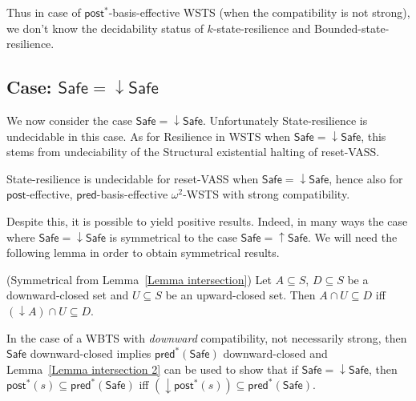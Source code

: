 \documentclass[runningheads]{llncs}
\newcommand{\mathieu}[1]{\todo[inline,color=blue!20]{{\bf MH:} #1}}
\newcommand{\pred}{\textsf{pred}}
\newcommand{\post}{\textsf{post}}
\newcommand{\Safe}{\textsf{Safe}}
\begin{document}
Thus in case of $\post^*$-basis-effective WSTS (when the compatibility is not strong), we don't know the decidability status of {\sc $k$-state-resilience} and 
{\sc Bounded-state-resilience}. 





\subsection{Case: $\Safe = \mathop{\downarrow} \Safe$}


We now consider the case $\Safe = \mathop{\downarrow} \Safe$.
%
Unfortunately {\sc State-resilience} is undecidable in this case. As for {\sc Resilience} in WSTS when $\Safe = \mathop{\downarrow} \Safe$, this stems from undeciability of the 
{\sc Structural existential halting} of reset-VASS.

\begin{proposition}\label{srp down up}
{\sc State-resilience} is undecidable for reset-VASS when
$\Safe=\mathop{\downarrow} \Safe$, hence also for
$\post$-effective,
 $\pred$-basis-effective $\omega^2$-WSTS with strong compatibility.
 \end{proposition}



Despite this, it is possible to yield positive results. Indeed, in many ways the case where $\Safe = \mathop{\downarrow} \Safe$
is symmetrical to the case $\Safe = \mathop{\uparrow} \Safe$.
%
We will need the following lemma in order to obtain symmetrical results.

\begin{lemma}(Symmetrical from Lemma~\ref{Lemma intersection})\label{Lemma intersection 2}
Let $A \subseteq S$, $D \subseteq S$ be a downward-closed set and $U \subseteq S$ be an upward-closed set. 
Then $A \cap U \subseteq D$  iff $ (\mathop{\downarrow}  A) \cap U \subseteq D$.
\end{lemma}




In the case of a WBTS with \emph{downward} compatibility, not necessarily strong,
then $\Safe$ downward-closed implies $\pred^*(\Safe)$ downward-closed and
Lemma~\ref{Lemma intersection 2} can be used to show that
if $\Safe = \mathop{\downarrow} \Safe$,
then
$\post^*(s)  
\subseteq \pred^*(\Safe)$  iff $ (\mathop{\downarrow}  \post^*(s)) 
\subseteq \pred^*(\Safe)$.
\end{document}
